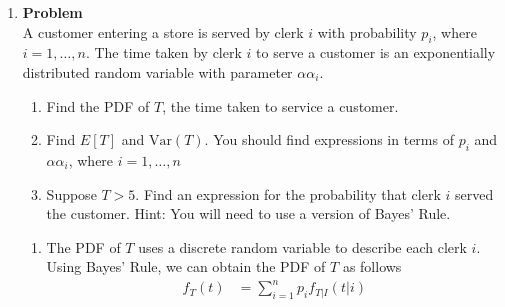 \documentclass[12pt]{article}
\newenvironment{Ex}{\textbf{Problem}\vspace{.75em}\\}{}
\newcommand{\dd}[1]{\:\mathrm{d}{#1}}
\begin{document}
\begin{enumerate}
\begin{Ex}
\begin{solution}
\begin{enumerate}
        \begin{equation}
          \label{eq:3c-sol}
          \begin{aligned}
            E[Y] &= \int_{-\infty}^{\infty} y f_Y(y) \dd{y} \\
            &= \int_{0}^{2} y\left(1-\frac{y}{2}\right) \dd{y} \\
            &= \int_{0}^{2} y-\frac{y^2}{2} \dd{y} \\
            &= \left[\frac{y^2}{2}-\frac{y^3}{6}\right]_{0}^{2}
            \dd{y} \\
            &= 2-\frac{4}{3} \\
            \implies E[Y] &= \frac{2}{3} \\
          \end{aligned}
        \end{equation}
      \end{enumerate}
    \end{solution}
  \end{Ex}
  \pagebreak[4]
\item
  \begin{Ex}
    A customer entering a store is served by clerk $i$ with
    probability $p_i$, where $i = 1,\ldots,n$. The time taken by clerk
    $i$ to serve a customer is an exponentially distributed random
    variable with parameter $\alpha\alpha_i$.
    \begin{enumerate}
    \item Find the PDF of $T$, the time taken to service a customer.
    \item Find $E[T]$ and $\text{Var}(T)$. You should find expressions
      in terms of $p_i$ and $\alpha\alpha_i$, where $i = 1,\ldots,n$
    \item Suppose $T > 5$. Find an expression for the probability that
      clerk $i$ served the customer. Hint: You will need to use a
      version of Bayes' Rule.
    \end{enumerate}
    \begin{solution} \hfill
      \begin{enumerate}
      \item The PDF of $T$ uses a discrete random variable to describe
        each clerk $i$. Using Bayes' Rule, we can obtain the PDF of
        $T$ as follows
        \begin{equation}
          \label{eq:4a-presol}
          \begin{aligned}
            f_T(t) &= \sum_{i=1}^{n} p_i f_{T|I}(t|i) \\

\end{aligned}
\end{equation}
\end{enumerate}
\end{solution}
\end{Ex}
\end{enumerate}
\end{document}
